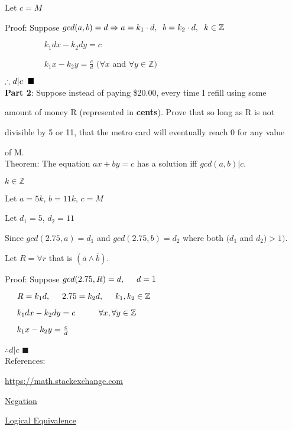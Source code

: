 \documentclass{article}
\begin{document}
Let $c = M$

Proof: Suppose $gcd(a,b) = d \Rightarrow a = k_1 \cdot d, \hspace{0.2cm} b = k_2 \cdot d, \hspace{0.2cm} k \in \mathbb{Z}$ 

$\hspace{2cm} k_1 d x - k_2 d y = c$

$\hspace{2cm} k_1 x - k_2 y = \frac{c}{d}$ \hspace{1cm} $(\forall x$ and $\forall y \in \mathbb{Z})$ 

$ \therefore d|c \hspace{0.2cm} \blacksquare$ \\

\textbf{Part 2}: Suppose instead of paying \$20.00, every time I refill using some

amount of money R (represented in \textbf{cents}). Prove that so long as R is not

divisible by 5 or 11, that the metro card will eventually reach 0 for any value 

of M. \\

Theorem: The equation $ax+by=c$ has a solution iff $gcd(a,b)|c$.

$k \in \mathbb{Z}$

Let $a=5k$, $b=11k$, $c=M$

Let $d_1 = 5$, $d_2 = 11$

Since $gcd(2.75, a) = d_1$ and $gcd(2.75, b) = d_2$ where both $(d_1$ and $d_2) > 1)$.

Let $R = \forall r$ that is $(\overline{a} \land \overline{b})$.

Proof: Suppose $gcd(2.75, R) = d, \hspace{0.5cm} d=1$

$\hspace{0.5cm} R = k_1 d, \hspace{0.5cm} 2.75 = k_2 d, \hspace{0.5cm} k_1, k_2 \in \mathbb{Z}$

$\hspace{0.5cm} k_1 d x - k_2 d y = c \hspace{1cm} \forall x, \forall y \in \mathbb{Z}$

$\hspace{0.5cm} k_1 x - k_2 y = \frac{c}{d}$

$\therefore d|c$ $\blacksquare$ \\





References:

\href{https://math.stackexchange.com/questions/304217/is-forall-x-exists-y-qx-y-the-same-as-exists-y-forall-x-qx-y}{https://math.stackexchange.com}

\href{https://www.math.toronto.edu/preparing-for-calculus/3_logic/we_3_negation.html}{Negation}

\href{https://www.csm.ornl.gov/~sheldon/ds/sec1.1.html}{Logical Equivalence}
\end{document}
